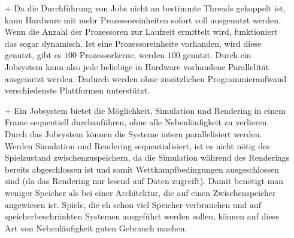 \begin{itemize}
	\item[$+$]  Da die Durchführung von Jobs nicht an bestimmte Threads gekoppelt ist, kann Hardware mit mehr Prozessoreinheiten sofort voll ausgenutzt werden. Wenn die Anzahl der Prozessoren zur Laufzeit ermittelt wird, funktioniert das sogar dynamisch. Ist eine Prozessoreinheite vorhanden, wird diese genutzt, gibt es $100$ Prozessorkerne, werden $100$ genutzt. Durch ein Jobsystem kann also jede beliebige in Hardware vorhandene Parallelität ausgenutzt werden. Dadurch werden ohne zusätzlichen Programmieraufwand verschiedenste Plattformen unterstützt.
	\item[$+$] Ein Jobsystem bietet die Möglichkeit, Simulation und Rendering in einem Frame sequentiell durchzuführen, ohne alle Nebenläufigkeit zu verlieren. Durch das Jobsystem können die Systeme intern parallelisiert werden. Werden Simulation und Rendering sequentialisiert, ist es nicht nötig des Spielzustand zwischenzuspeichern, da die Simulation während des Renderings bereits abgeschlossen ist und somit Wettkampfbedingungen ausgeschlossen sind (da das Rendering nur lesend auf Daten zugreift). Damit benötigt man weniger Speicher als bei einer Architektur, die auf einen Zwischenspeicher angewiesen ist. Spiele, die eh schon viel Speicher verbrauchen und auf speicherbeschränkten Systemen ausgeführt werden sollen, können auf diese Art von Nebenläufigkeit guten Gebrauch machen. 
	

\end{itemize}
